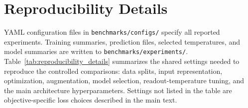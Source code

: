\documentclass[12pt]{article}
\begin{document}
\FloatBarrier

\section{Reproducibility Details}
\label{app:reproducibility_details}

YAML configuration files in \nolinkurl{benchmarks/configs/} specify all reported experiments. Training summaries, prediction files, selected temperatures, and model summaries are written to \nolinkurl{benchmarks/experiments/}. Table~\ref{tab:reproducibility_details} summarizes the shared settings needed to reproduce the controlled comparisons: data splits, input representation, optimization, augmentation, model selection, readout-temperature tuning, and the main architecture hyperparameters. Settings not listed in the table are objective-specific loss choices described in the main text.
\end{document}
